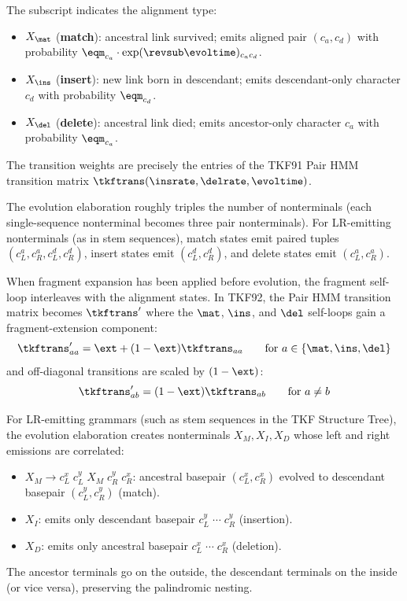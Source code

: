 \begin{definition}
The subscript indicates the alignment type:
\begin{itemize}
\item $X_\mat$ (\textbf{match}): ancestral link survived; emits
  aligned pair $(c_a, c_d)$ with probability
  $\eqm_{c_a} \cdot \exp(\revsub \evoltime)_{c_a c_d}$.
\item $X_\ins$ (\textbf{insert}): new link born in descendant;
  emits descendant-only character $c_d$ with probability $\eqm_{c_d}$.
\item $X_\del$ (\textbf{delete}): ancestral link died; emits
  ancestor-only character $c_a$ with probability $\eqm_{c_a}$.
\end{itemize}

The transition weights are precisely the entries of the TKF91
Pair HMM transition matrix $\tkftrans(\insrate, \delrate, \evoltime)$.
\end{definition}

\begin{proposition}
The evolution elaboration roughly triples the number of nonterminals
(each single-sequence nonterminal becomes three pair nonterminals).
For LR-emitting nonterminals (as in stem sequences),
match states emit paired tuples $(c_L^a, c_R^a, c_L^d, c_R^d)$,
insert states emit $(c_L^d, c_R^d)$, and delete states emit
$(c_L^a, c_R^a)$.
\end{proposition}

\begin{remark}
When fragment expansion has been applied before evolution,
the fragment self-loop interleaves with the alignment states.
In TKF92, the Pair HMM transition matrix becomes
$\tkftrans'$ where the $\mat$, $\ins$, and $\del$ self-loops
gain a fragment-extension component:
\[
\tkftrans'_{aa} = \ext + (1-\ext)\tkftrans_{aa}
\qquad \text{for } a \in \{\mat, \ins, \del\}
\]
and off-diagonal transitions are scaled by $(1-\ext)$:
\[
\tkftrans'_{ab} = (1-\ext)\tkftrans_{ab}
\qquad \text{for } a \neq b
\]
\end{remark}

\begin{remark}
For LR-emitting grammars (such as stem sequences in the TKF Structure Tree),
the evolution elaboration creates nonterminals $X_M, X_I, X_D$
whose left and right emissions are correlated:
\begin{itemize}
\item $X_M \to c_L^x\;c_L^y\;X_M\;c_R^y\;c_R^x$:
  ancestral basepair $(c_L^x, c_R^x)$ evolved to
  descendant basepair $(c_L^y, c_R^y)$ (match).
\item $X_I$: emits only descendant basepair $c_L^y\;\cdots\;c_R^y$ (insertion).
\item $X_D$: emits only ancestral basepair $c_L^x\;\cdots\;c_R^x$ (deletion).
\end{itemize}
The ancestor terminals go on the outside, the descendant terminals
on the inside (or vice versa), preserving the palindromic nesting.
\end{remark}

